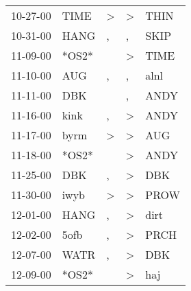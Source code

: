 \begin{supertabular}{p{0.07\textwidth}p{0.06\textwidth}p{0.02\textwidth}p{0.02\textwidth}p{0.06\textwidth}}
          10-27-00\textsuperscript{} &           TIME\textsuperscript{} &     \textgreater &     \textgreater &           THIN\textsuperscript{} \\
          10-31-00\textsuperscript{} &           HANG\textsuperscript{} &                , &                , &           SKIP\textsuperscript{} \\
          11-09-00\textsuperscript{} &                            *OS2* &                  &     \textgreater &           TIME\textsuperscript{} \\
          11-10-00\textsuperscript{} &            AUG\textsuperscript{} &                , &                , &           alnl\textsuperscript{} \\
          11-11-00\textsuperscript{} &            DBK\textsuperscript{} &                  &                , &           ANDY\textsuperscript{} \\
          11-16-00\textsuperscript{} &           kink\textsuperscript{} &                , &     \textgreater &           ANDY\textsuperscript{} \\
          11-17-00\textsuperscript{} &           byrm\textsuperscript{} &     \textgreater &     \textgreater &            AUG\textsuperscript{} \\
          11-18-00\textsuperscript{} &                            *OS2* &                  &     \textgreater &           ANDY\textsuperscript{} \\
          11-25-00\textsuperscript{} &            DBK\textsuperscript{} &                , &     \textgreater &            DBK\textsuperscript{} \\
          11-30-00\textsuperscript{} &           iwyb\textsuperscript{} &     \textgreater &     \textgreater &           PROW\textsuperscript{} \\
          12-01-00\textsuperscript{} &           HANG\textsuperscript{} &                , &     \textgreater &           dirt\textsuperscript{} \\
          12-02-00\textsuperscript{} &           5ofb\textsuperscript{} &                , &     \textgreater &           PRCH\textsuperscript{} \\
          12-07-00\textsuperscript{} &           WATR\textsuperscript{} &                , &     \textgreater &            DBK\textsuperscript{} \\
          12-09-00\textsuperscript{} &                            *OS2* &                  &     \textgreater &            haj\textsuperscript{} \\

\end{supertabular}
